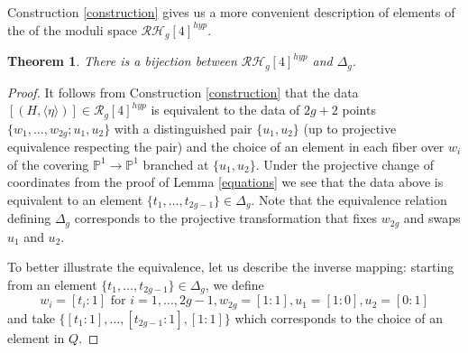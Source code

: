 \documentclass{article}
\newtheorem{thm}{Theorem}[section]
\numberwithin{equation}{section}
\begin{document}
Construction \ref{construction} gives us a more convenient description of elements of the of the moduli space $\mathcal{RH}_g[4]^{hyp}$.

\begin{thm}
\label{moduli}
    There is a bijection between $\mathcal{RH}_g[4]^{hyp}$ and $\Delta_g$.
\end{thm}
\begin{proof}

It follows from Construction \ref{construction} that the data $[(H, \langle \eta \rangle)] \in \mathcal{R}_g[4]^{hyp}$ is equivalent to the data of $2g+2$ points $\{w_1,\ldots,w_{2g};u_1,u_2\}$ with a distinguished pair $\{u_1,u_2\}$ (up to projective equivalence respecting the pair) and the choice of an element in each fiber over $w_i$ of the covering $\mathbb{P}^1 \to \mathbb{P}^1$ branched at $\{u_1, u_2\}$. Under the projective change of coordinates from the proof of Lemma \ref{equations} we see that the data above is equivalent to an element $\{t_1, \ldots, t_{2g-1}\} \in \Delta_g$. Note that the equivalence relation defining $\Delta_g$ corresponds to the projective transformation that fixes \(w_{2g}\) and swaps \(u_1\) and \(u_2\).

To better illustrate the equivalence, let us describe the inverse mapping: starting from an element $\{t_1, \ldots, t_{2g-1}\} \in \Delta_g$, we define $$ w_i = [t_i:1] \text{ for } i=1,\ldots, 2g-1,  w_{2g} = [1:1], u_1 = [1:0], u_2 = [0:1]$$ and take $\{[t_1:1], \ldots, [t_{2g-1}:1], [1:1]\}$ which corresponds to the choice of an element in $Q$. 


\end{proof}
\end{document}
